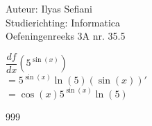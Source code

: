 \documentclass[a4paper]{article}
\begin{document}
\noindent \large Auteur: Ilyas Sefiani \\
\noindent \large Studierichting: Informatica\\
\noindent \large Oefeningenreeks 3A nr. 35.5\\

\medskip

\normalsize

$\dfrac{df}{dx}(5^{\sin(x)})$\\

$= 5^{\sin(x)}\ln(5)(\sin(x))'$\\

$= \cos(x)5^{\sin(x)}\ln(5)$\\

\begin{thebibliography}{999}
\end{thebibliography}
\end{document}
